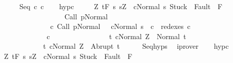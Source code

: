 \begin{isabellebody}
\ \ \ \ \isamarkupfalse%
\isanewline
{}\isamarkupfalse%
\isanewline
\ \ \isamarkupfalse%
\ {\isacharparenleft}Seq\ c{}\ c{}{\isacharparenright}\isanewline
\ \ \isamarkupfalse%
\ hyp{\isacharunderscore}c{}{\isacharcolon}\ \isanewline
\ \ \ \ {\isachardoublequoteopen}{\isasymforall}Z{\isachardot}\ {\isasymGamma}{\isacharcomma}{\isasymTheta}{\isasymturnstile}\isactrlsub t\isactrlbsub {\isacharslash}F\isactrlesub \ {\isacharbraceleft}s{\isachardot}\ s{\isacharequal}Z\ {\isasymand}\ {\isasymGamma}{\isasymturnstile}{\isasymlangle}c{}{\isacharcomma}Normal\ s{\isasymrangle}\ {\isasymRightarrow}{\isasymnotin}{\isacharparenleft}{\isacharbraceleft}Stuck{\isacharbraceright}\ {\isasymunion}\ Fault\ {\isacharbackquote}\ {\isacharparenleft}{\isacharminus}F{\isacharparenright}{\isacharparenright}\ {\isasymand}\ \isanewline
\ \ \ \ \ \ \ \ \ \ \ \ \ \ \ \ \ \ \ \ \ {\isasymGamma}{\isasymturnstile}Call\ p{\isasymdown}Normal\ {\isasymsigma}\ {\isasymand}\isanewline
\ \ \ \ \ \ \ \ \ \ \ \ \ \ \ \ \ {\isacharparenleft}{\isasymexists}c{\isacharprime}{\isachardot}\ {\isasymGamma}{\isasymturnstile}{\isacharparenleft}Call\ p{\isacharcomma}Normal\ {\isasymsigma}{\isacharparenright}\ {\isasymrightarrow}\isactrlsup {\isacharplus}\ {\isacharparenleft}c{\isacharprime}{\isacharcomma}Normal\ s{\isacharparenright}\ {\isasymand}\ c{}\ {\isasymin}\ redexes\ c{\isacharprime}{\isacharparenright}{\isacharbraceright}\isanewline
\ \ \ \ \ \ \ \ \ \ \ \ \ \ \ \ c{}\ \isanewline
\ \ \ \ \ \ \ \ \ \ \ \ \ \ \ {\isacharbraceleft}t{\isachardot}\ {\isasymGamma}{\isasymturnstile}{\isasymlangle}c{}{\isacharcomma}Normal\ Z{\isasymrangle}\ {\isasymRightarrow}\ Normal\ t{\isacharbraceright}{\isacharcomma}\isanewline
\ \ \ \ \ \ \ \ \ \ \ \ \ \ \ {\isacharbraceleft}t{\isachardot}\ {\isasymGamma}{\isasymturnstile}{\isasymlangle}c{}{\isacharcomma}Normal\ Z{\isasymrangle}\ {\isasymRightarrow}\ Abrupt\ t{\isacharbraceright}{\isachardoublequoteclose}\isanewline
\ \ \ \ \isamarkupfalse%
\ Seq{\isachardot}hyps\ \isamarkupfalse%
\ iprover\isanewline
\ \ \isamarkupfalse%
\ hyp{\isacharunderscore}c{}{\isacharcolon}\ \isanewline
\ \ \ \ {\isachardoublequoteopen}{\isasymforall}Z{\isachardot}\ {\isasymGamma}{\isacharcomma}{\isasymTheta}{\isasymturnstile}\isactrlsub t\isactrlbsub {\isacharslash}F\isactrlesub \ {\isacharbraceleft}s{\isachardot}\ s{\isacharequal}Z\ {\isasymand}\ {\isasymGamma}{\isasymturnstile}{\isasymlangle}c{}{\isacharcomma}Normal\ s{\isasymrangle}\ {\isasymRightarrow}{\isasymnotin}{\isacharparenleft}{\isacharbraceleft}Stuck{\isacharbraceright}\ {\isasymunion}\ Fault\ {\isacharbackquote}\ {\isacharparenleft}{\isacharminus}F{\isacharparenright}{\isacharparenright}\ {\isasymand}\ \isanewline

\end{isabellebody}
